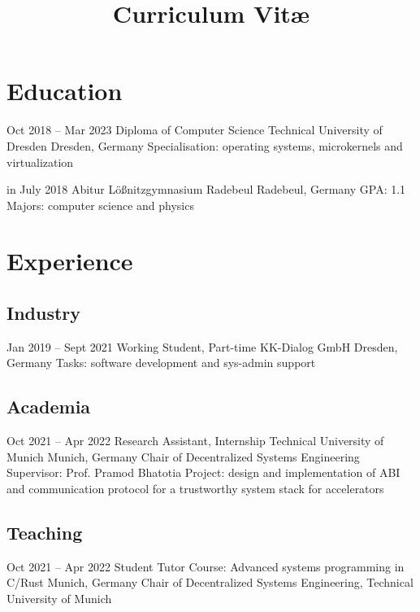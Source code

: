 \documentclass[11pt,a4paper,sans]{moderncv}
\title{Curriculum Vit\ae{}}
\begin{document}

\makecvtitle

\section{Education}
\cventry
  {Oct 2018 -- Mar 2023}
  {Diploma of Computer Science}
  {Technical University of Dresden}
  {Dresden, Germany}
  {}
  {
    Specialisation: operating systems, microkernels and virtualization
  }

\cventry
  {in July 2018}
  {Abitur}
  {Lößnitzgymnasium Radebeul}
  {Radebeul, Germany}
  {GPA: 1.1}
  {
    Majors: computer science and physics
  }

\section{Experience}

\subsection{Industry}
\cventry
  {Jan 2019 -- Sept 2021}
  {Working Student, Part-time}
  {KK-Dialog GmbH}
  {Dresden, Germany}
  {}
  {
    Tasks: software development and sys-admin support
  }

\subsection{Academia}
\cventry
  {Oct 2021 -- Apr 2022}
  {Research Assistant, Internship}
  {Technical University of Munich}
  {Munich, Germany}
  {}
  {
    Chair of Decentralized Systems Engineering
    \newline
    Supervisor: Prof. Pramod Bhatotia
    \newline
    Project: design and implementation of ABI and communication protocol for a trustworthy system stack for accelerators
  }

\subsection{Teaching}
\cventry
  {Oct 2021 -- Apr 2022}
  {Student Tutor}
  {Course: Advanced systems programming in C/Rust}
  {Munich, Germany}
  {}
  {
    Chair of Decentralized Systems Engineering, Technical University of Munich
  }

\end{document}
